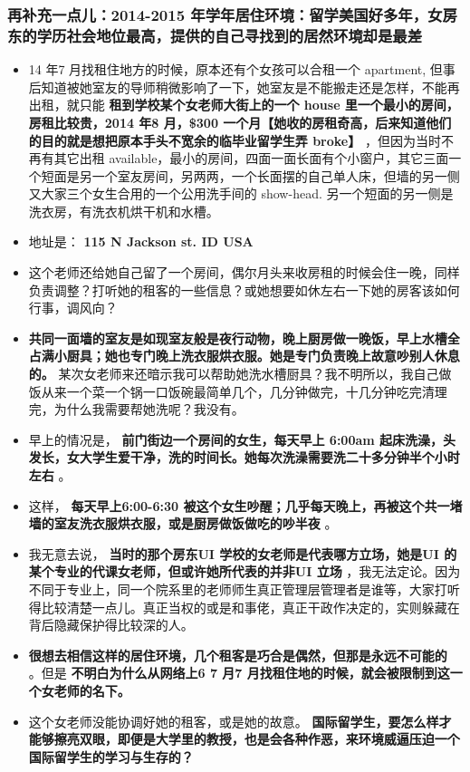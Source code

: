 \documentclass[9pt, b5paper]{article}
\begin{document}
\subsubsection{再补充一点儿：2014-2015 年学年居住环境：留学美国好多年，女房东的学历社会地位最高，提供的自己寻找到的居然环境却是最差}
\label{sec-3-1-4}
\begin{itemize}
\item 14 年7 月找租住地方的时候，原本还有个女孩可以合租一个 apartment, 但事后知道被她室友的导师稍微影响了一下，她室友是不能搬走还是怎样，不能再出租，就只能 \textbf{租到学校某个女老师大街上的一个 house 里一个最小的房间，房租比较贵，2014 年8 月，\$300 一个月【她收的房租奇高，后来知道他们的目的就是想把原本手头不宽余的临毕业留学生弄 broke】} ，但因为当时不再有其它出租 available，最小的房间，四面一面长面有个小窗户，其它三面一个短面是另一个室友房间，另两两，一个长面摆的自己单人床，但墙的另一侧又大家三个女生合用的一个公用洗手间的 show-head. 另一个短面的另一侧是洗衣房，有洗衣机烘干机和水槽。
\item 地址是： \textbf{115 N Jackson st. ID USA}
\item 这个老师还给她自己留了一个房间，偶尔月头来收房租的时候会住一晚，同样负责调整？打听她的租客的一些信息？或她想要如休左右一下她的房客该如何行事，调风向？
\item \textbf{共同一面墙的室友是如现室友般是夜行动物，晚上厨房做一晚饭，早上水槽全占满小厨具；她也专门晚上洗衣服烘衣服。她是专门负责晚上故意吵别人休息的。} 某次女老师来还暗示我可以帮助她洗水槽厨具？我不明所以，我自己做饭从来一个菜一个锅一口饭碗最简单几个，几分钟做完，十几分钟吃完清理完，为什么我需要帮她洗呢？我没有。
\item 早上的情况是， \textbf{前门街边一个房间的女生，每天早上 6:00am 起床洗澡，头发长，女大学生爱干净，洗的时间长。她每次洗澡需要洗二十多分钟半个小时左右} 。
\item 这样， \textbf{每天早上6:00-6:30 被这个女生吵醒；几乎每天晚上，再被这个共一堵墙的室友洗衣服烘衣服，或是厨房做饭做吃的吵半夜} 。
\item 我无意去说， \textbf{当时的那个房东UI 学校的女老师是代表哪方立场，她是UI 的某个专业的代课女老师，但或许她所代表的并非UI 立场} ，我无法定论。因为不同于专业上，同一个院系里的老师师生真正管理层管理者是谁等，大家打听得比较清楚一点儿。真正当权的或是和事佬，真正干政作决定的，实则躲藏在背后隐藏保护得比较深的人。
\item \textbf{很想去相信这样的居住环境，几个租客是巧合是偶然，但那是永远不可能的} 。但是 \textbf{不明白为什么从网络上6 7 月7 月找租住地的时候，就会被限制到这一个女老师的名下。}
\item 这个女老师没能协调好她的租客，或是她的故意。 \textbf{国际留学生，要怎么样才能够擦亮双眼，即便是大学里的教授，也是会各种作恶，来环境威逼压迫一个国际留学生的学习与生存的？}

\end{itemize}
\end{document}
